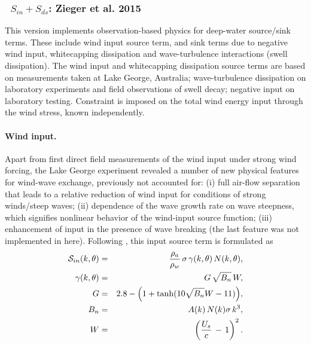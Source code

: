 \vsssub
\subsubsection{~$S_{in} + S_{ds}$: Zieger et al. 2015} \label{sec:ST6}
\vsssub


\noindent
This version implements observation-based physics for deep-water source/sink terms. These include wind input
source term, and sink terms due to negative wind input, whitecapping
dissipation and wave-turbulence interactions (swell dissipation).
The wind input and whitecapping dissipation source terms are based on
measurements taken at Lake George, Australia; wave-turbulence dissipation
on laboratory experiments and field observations of swell decay; negative
input on laboratory testing. Constraint is imposed on the total wind
energy input through the wind stress, known independently.

\paragraph{Wind input.} Apart from first direct field measurements
of the wind input under strong wind forcing,  the Lake George experiment
revealed a number of new physical features for wind-wave exchange,
previously not accounted for:
(i) full air-flow separation that leads to a relative reduction of
wind input for conditions of strong winds/steep waves;
(ii) dependence of the wave growth rate on wave steepness,
which signifies nonlinear behavior of the wind-input source function;
(iii) enhancement of input in the presence of wave breaking
\citep{art:Dea06,art:Bea07} (the last feature was not implemented in here).
Following \citet{art:RBW12}, this input source term is formulated as
\begin{eqnarray}
\cS_{in}(k,\theta) & = & \frac{\rho_a}{\rho_w}\, \sigma\,\gamma(k,\theta)\,N(k,\theta)  ,
\label{eq:ST601} \\ \gamma(k,\theta) &=& G\,\sqrt{B_n}\,W  ,
\label{eq:ST602} \\
G                &=& 2.8-\Bigl (1+\tanh (10\sqrt{B_n}W-11) \Bigr)  ,
\label{eq:ST603} \\
B_n              &=& A(k)\,N(k)\sigma\,k^3  ,
\label{eq:ST604} \\
W                &=& \left (\frac{U_s}{c}\,-\,1 \right )^2  .
\label{eq:ST605}
\end{eqnarray}

